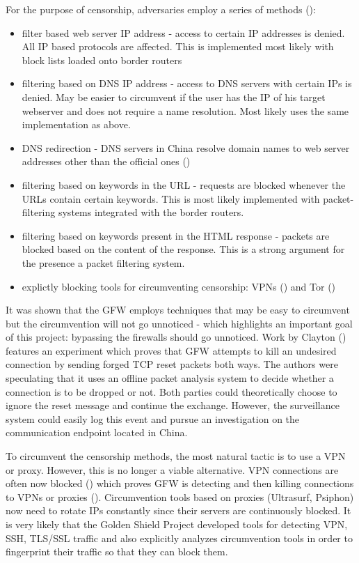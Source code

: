 \documentclass[11pt]{article} %
\begin{document}
For the purpose of censorship, adversaries employ a series of methods (\citep*{internetFilteringChina}):

\begin{itemize}
\item filter based web server IP address - access to certain IP addresses is denied. All IP based protocols are affected. This is implemented most likely with block lists loaded onto border routers
\item filtering based on DNS IP address - access to DNS servers with certain IPs is denied. May be easier to circumvent if the user has the IP of his target webserver and does not require a name resolution. Most likely uses the same implementation as above.
\item DNS redirection - DNS servers in China resolve domain names to web server addresses other than the official ones (\citep*{dnsWall})
\item filtering based on keywords in the URL - requests are blocked whenever the URLs contain certain keywords. This is most likely implemented with packet-filtering systems integrated with the border routers.
\item filtering based on keywords present in the HTML response - packets are blocked based on the content of the response. This is a strong argument for the presence a packet filtering system.
\item explictly blocking tools for circumventing censorship: VPNs (\citep*{web:guardianChinaFirewall}) and Tor (\citep*{winterInChina}) 
\end{itemize}


It was shown that the GFW employs techniques that may be easy to circumvent but the circumvention will not go unnoticed - which highlights an important goal of this project: bypassing the firewalls should go unnoticed. Work by Clayton (\citep*{ignoringChina}) features an experiment which proves that GFW attempts to kill an undesired connection by sending forged TCP reset packets both ways. The authors were speculating that it uses an offline packet analysis system to decide whether a connection is to be dropped or not. Both parties could theoretically choose to ignore the reset message and continue the exchange. However, the surveillance system could easily log this event and pursue an investigation on the communication endpoint located in China.

To circumvent the censorship methods, the most natural tactic is to use a VPN or proxy. However, this is no longer a viable alternative. VPN connections are often now blocked (\citep*{web:guardianChinaFirewall}) which proves GFW is detecting and then killing connections to VPNs or proxies (\citep*{hikingGFW}). Circumvention tools based on proxies (Ultrasurf, Psiphon) now need to rotate IPs constantly since their servers are continuously blocked. It is very likely that the Golden Shield Project developed tools for detecting VPN, SSH, TLS/SSL traffic and also explicitly analyzes circumvention tools in order to fingerprint their traffic so that they can block them.
\end{document}
